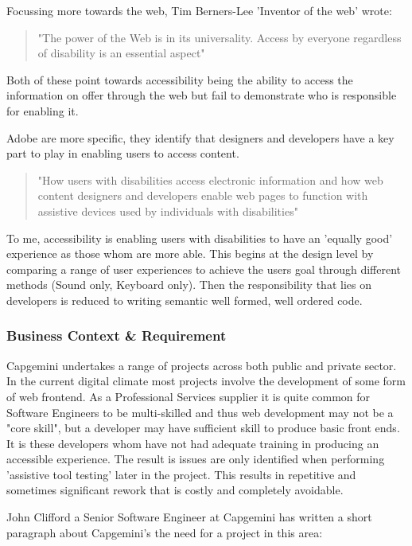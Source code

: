 Focussing more towards the web, Tim Berners-Lee 'Inventor of the web' wrote:
\begin{quote}
"The power of the Web is in its universality. Access by everyone regardless
of disability is an essential aspect"
\end{quote}

Both of these point towards accessibility being the ability to access the
information on offer through the web but fail to demonstrate who is
responsible for enabling it.

Adobe are more specific, they identify that designers and developers
 have a key part to play in enabling users to access content.

\begin{quote}
"How users with disabilities access electronic information and how web content
designers and developers enable web pages to function with assistive devices
used by individuals with disabilities"
\end{quote}

To me, accessibility is enabling users with disabilities to have an 'equally good'
experience as those whom are more able. This begins at the
design level by comparing a range of user experiences to achieve the users
goal through different methods (Sound only, Keyboard only). Then the
responsibility that lies on developers is reduced to writing semantic well formed,
well ordered code.


\subsubsection{Business Context & Requirement}
Capgemini undertakes a range of projects across both public and private
sector. In the current digital climate most projects involve the
development of some form of web frontend. As a Professional Services supplier it
 is quite common for Software Engineers to be multi-skilled and thus web
 development may not be a "core skill", but a developer may have sufficient
 skill to produce basic front ends. It is these developers whom have
 not had adequate training in producing an accessible experience. The result
 is issues are only identified when performing 'assistive tool testing'
 later in the project. This results in repetitive and sometimes significant
 rework that is costly and completely avoidable.

John Clifford a Senior Software Engineer at Capgemini has written a short
paragraph about Capgemini's the need for a project in this area:
\begin{quote}
\end{quote}

